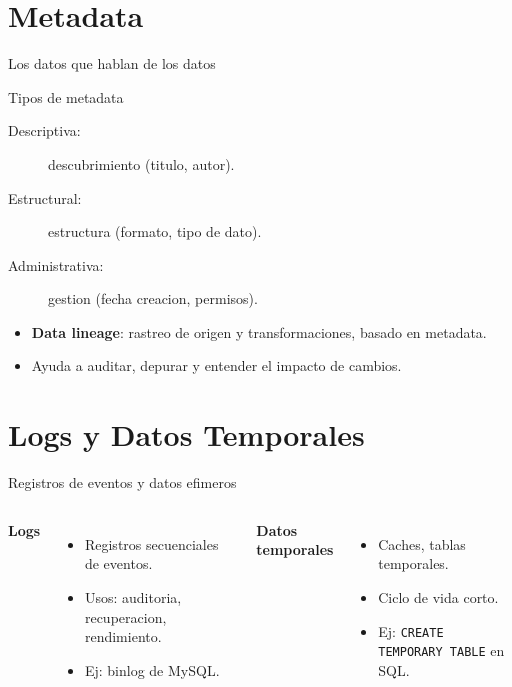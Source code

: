 \documentclass[aspectratio=169, 10pt, xcolor=table]{beamer}
\begin{document}
\section{Metadata}

\begin{frame}{Los datos que hablan de los datos}
    \begin{block}{Tipos de metadata}
        \begin{description}
            \item[Descriptiva:] descubrimiento (titulo, autor).
            \item[Estructural:] estructura (formato, tipo de dato).
            \item[Administrativa:] gestion (fecha creacion, permisos).
        \end{description}
    \end{block}
    \begin{itemize}
        \item \textbf{Data lineage}: rastreo de origen y transformaciones, basado en metadata.
        \item Ayuda a auditar, depurar y entender el impacto de cambios.
    \end{itemize}
\end{frame}

\section{Logs y Datos Temporales}

\begin{frame}{Registros de eventos y datos efimeros}
    \begin{columns}[t]
        \textbf{Logs}
        \begin{itemize}
            \item Registros secuenciales de eventos.
            \item Usos: auditoria, recuperacion, rendimiento.
            \item Ej: binlog de MySQL.
        \end{itemize}
        \textbf{Datos temporales}
        \begin{itemize}
            \item Caches, tablas temporales.
            \item Ciclo de vida corto.
            \item Ej: \texttt{CREATE TEMPORARY TABLE} en SQL.
        \end{itemize}
    \end{columns}
\end{frame}
\end{document}
